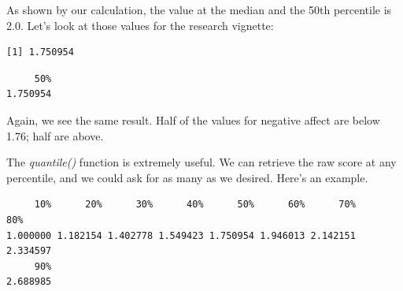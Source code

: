 \documentclass[
  11pt,
]{book}
\newenvironment{Shaded}{\begin{snugshade}}{\end{snugshade}}
\newcommand{\AttributeTok}[1]{\textcolor[rgb]{0.77,0.63,0.00}{#1}}
\newcommand{\ConstantTok}[1]{\textcolor[rgb]{0.00,0.00,0.00}{#1}}
\newcommand{\FloatTok}[1]{\textcolor[rgb]{0.00,0.00,0.81}{#1}}
\newcommand{\FunctionTok}[1]{\textcolor[rgb]{0.00,0.00,0.00}{#1}}
\newcommand{\NormalTok}[1]{#1}
\newcommand{\SpecialCharTok}[1]{\textcolor[rgb]{0.00,0.00,0.00}{#1}}
\begin{document}
As shown by our calculation, the value at the median and the 50th percentile is 2.0. Let's look at those values for the research vignette:

\begin{Shaded}
\end{Shaded}

\begin{verbatim}
[1] 1.750954
\end{verbatim}

\begin{Shaded}
\end{Shaded}

\begin{verbatim}
     50% 
1.750954 
\end{verbatim}

Again, we see the same result. Half of the values for negative affect are below 1.76; half are above.

The \emph{quantile()} function is extremely useful. We can retrieve the raw score at any percentile, and we could ask for as many as we desired. Here's an example.

\begin{Shaded}
\end{Shaded}

\begin{verbatim}
     10%      20%      30%      40%      50%      60%      70%      80% 
1.000000 1.182154 1.402778 1.549423 1.750954 1.946013 2.142151 2.334597 
     90% 
2.688985 
\end{verbatim}
\end{document}
